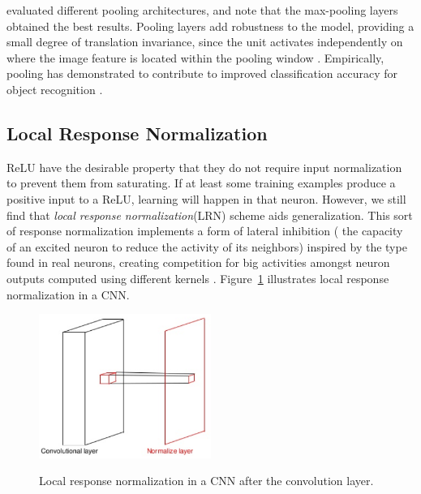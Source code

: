 \citet{scherer2010evaluation} evaluated different pooling architectures, and note that the max-pooling layers obtained the best results. Pooling layers add robustness to the model, providing a small degree of translation invariance, since the unit activates independently on where the image feature is located within the pooling window \cite{bengio2013deep}. Empirically, pooling has demonstrated to contribute to improved classification accuracy for object recognition \cite{lecun1989backpropagation}.


\subsection{Local Response Normalization}
\label{lrnlayer}
ReLU have the desirable property that they do not require input normalization to prevent them from saturating. If at least some training examples produce a positive input to a ReLU, learning will happen in that neuron. However, we still find that \textit{local response normalization}(LRN) scheme aids generalization. This sort of response normalization implements a form of lateral inhibition ( the capacity of an excited neuron to reduce the activity of its neighbors) inspired by the type found in real neurons, creating competition for big activities amongst neuron outputs computed using different kernels \cite{krizhevsky2012imagenet}. Figure~\ref{fig:lrns} illustrates local response normalization in a CNN. 
\begin{figure}[H]
	\centering
	{\includegraphics[width=0.5\textwidth]{images/lrn}}
	\caption{Local response normalization in a CNN after the convolution layer.}
	\label{fig:lrns}
\end{figure}

